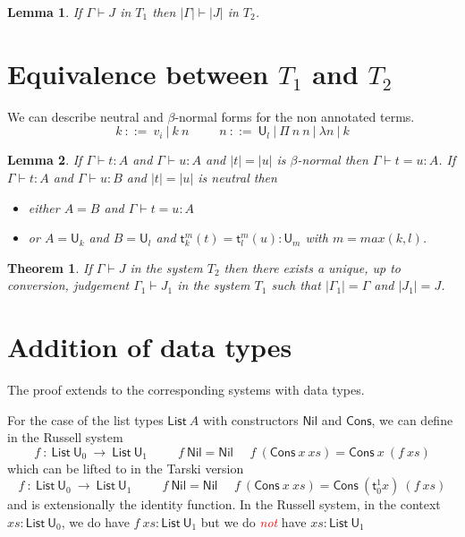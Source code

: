 \documentclass[11pt,a4paper]{article}
\newtheorem{theorem}{Theorem}[section]
\newtheorem{lemma}{Lemma}[theorem]
\theoremstyle{definition}
\def\UU{\mathsf{U}}
\def\List{\mathsf{List}}
\def\Cons{\mathsf{Cons}}
\def\Nil{\mathsf{Nil}}
\newcommand{\sT}{\mathsf{t}}
\newcommand{\EMP}[1]{\emph{\textcolor{red}{#1}}}
\begin{document}
\begin{lemma}
  If $\Gamma\vdash J$ in $T_1$ then $|\Gamma|\vdash |J|$ in $T_2$.
\end{lemma}


\section{Equivalence between $T_1$ and $T_2$}

We can describe neutral and $\beta$-normal forms for the non annotated terms.
$$
k~::=~v_i~|~k~n~~~~~~~~~~~n~::=~\UU_l~|~\Pi~n~n~|~\lambda n~|~k
$$


\begin{lemma}
  If $\Gamma\vdash t:A$ and $\Gamma\vdash u:A$ and $|t| = |u|$ is $\beta$-normal then $\Gamma\vdash t = u:A$.
  If $\Gamma\vdash t:A$ and $\Gamma\vdash u:B$ and $|t| = |u|$ is neutral then
  \begin{itemize}
    \item either $A = B$
      and $\Gamma\vdash t = u:A$
    \item or $A = \UU_k$ and $B = \UU_l$ and $\sT_k^m(t) = \sT_l^m(u):\UU_m$ with $m = max(k,l)$.
  \end{itemize}
\end{lemma}

\begin{theorem}
  If $\Gamma\vdash J$ in the system $T_2$ then there exists a unique, up to conversion, judgement $\Gamma_1\vdash J_1$
  in the system $T_1$ such that $|\Gamma_1| = \Gamma$ and $|J_1| = J$.
\end{theorem}

\section{Addition of data types}

The proof extends to the corresponding systems with data types.

For the case of the list types $\List~A$ with constructors $\Nil$ and $\Cons$, we can define in the Russell system
$$
f~:~\List~\UU_0~\rightarrow~\List~\UU_1~~~~~~~~~~~
f~\Nil = \Nil~~~~~~f~(\Cons~x~xs) = \Cons~x~(f~xs)
$$
which can be lifted to in the Tarski version
$$
f~:~\List~\UU_0~\rightarrow~\List~\UU_1~~~~~~~~~~~
f~\Nil = \Nil~~~~~~f~(\Cons~x~xs) = \Cons~(\sT_0^1 x)~(f~xs)
$$
and is extensionally the identity function.
In the Russell system, in the context  $xs:\List~\UU_0$,
we do have $f~xs:\List~\UU_1$ but we do \EMP{not} have $xs:\List~\UU_1$
\end{document}

